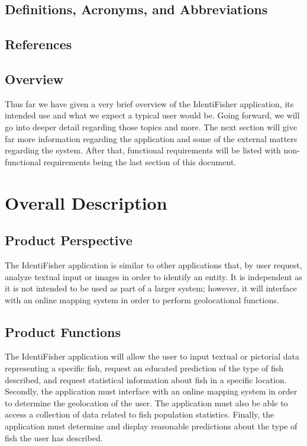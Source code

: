 \documentclass{article}
\begin{document}
\subsection{Definitions, Acronyms, and Abbreviations}

\iffalse
Anything can be added either by anyone on the team including myself, Chris.
\fi

\subsection{References}

\iffalse
Same goes for this, anything can be added as needed. I can cite if you wish.
\fi

\subsection{Overview}
Thus far we have given a very brief overview of the IdentiFisher application, its intended
use and what we expect a typical user would be. Going forward, we will go into deeper detail
regarding those topics and more. The next section will give far more information regarding
the application and some of the external matters regarding the system. After that, functional
requirements will be listed with non-functional requirements being the last section of this document.

\section{Overall Description}

\iffalse
This is still a rough draft of the overall desciption. If anyone would like to edit/add to this section, feel free.
\fi

\subsection{Product Perspective}

The IdentiFisher application is similar to other applications that, by user request, analyze textual input or images in order to identify an entity. It is independent as it is not intended to be used as part of a larger system; however, it will interface with an online mapping system in order to perform geolocational functions.

\subsection{Product Functions}
The IdentiFisher application will allow the user to input textual or pictorial data representing a specific fish, request an educated prediction of the type of fish described, and request statistical information about fish in a specific location. Secondly, the application must interface with an online mapping system in order to determine the geolocation of the user. The application must also be able to access a collection of data related to fish population statistics. Finally, the application must determine and display reasonable predictions about the type of fish the user has described.
\end{document}
